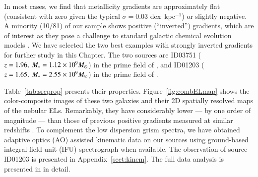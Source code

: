 In most cases, we find that metallicity gradients are approximately flat (\ie consistent with zero given the typical
$\sigma=0.03$ dex~kpc$^{-1}$) or slightly negative. A minority (10/81) of our sample shows positive (\ie ``inverted'') gradients,
which are of interest as they pose a challenge to standard galactic chemical evolution models 
\citep[\eg,][]{Molla:2005eq,Molla:2018em}.
We have selected the two best examples with strongly inverted gradients for further study in this Chapter.
The two sources are ID03751 ($z=1.96,~M_\ast=1.12\times10^9M_\odot$) in the prime field of \clsan, and ID01203
($z=1.65,~M_\ast=2.55\times10^9M_\odot$) in the prime field of \clba.

Table~\ref{tab:srcprop} presents their properties.
Figure~\ref{fig:combELmap} shows the color-composite \hst images of these two galaxies and their 2D spatially
resolved maps of the nebular ELs.
Remarkably, they have \Mstar considerably lower --- by one order of magnitude --- than those of previous positive gradients 
measured at similar redshifts \citep[see \eg,][]{Cresci:2010hr,Queyrel:2012hw,2014MNRAS.443.2695S,Metallicityevolutio:2014kg}.
To complement the low dispersion grism spectra, we have obtained adaptive optics (AO) assisted kinematic data on our sources using 
ground-based integral-field unit (IFU) spectrograph when available.
The observation of source ID01203 is presented in Appendix~\ref{sect:kinem}.
The full data analysis is presented in \citet{Hirtenstein:2018tn} in detail.



